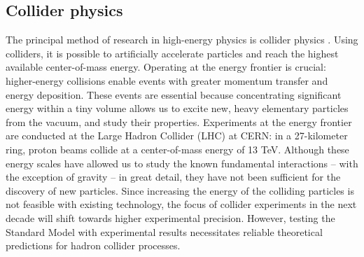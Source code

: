 \documentclass[a4paper, 12pt]{book}
\begin{document}
\subsection{Collider physics}
The principal method of research in high-energy physics is collider physics \cite{ellis}. Using colliders, it is possible to artificially accelerate particles and reach the highest available center-of-mass energy. Operating at the energy frontier is crucial: higher-energy collisions enable events with greater momentum transfer and energy deposition. These events are essential because concentrating significant energy within a tiny volume allows us to excite new, heavy elementary particles from the vacuum, and study their properties. Experiments at the energy frontier are conducted at the Large Hadron Collider (LHC) at CERN: in a 27-kilometer ring, proton beams collide at a center-of-mass energy of 13 TeV. Although these energy scales have allowed us to study the known fundamental interactions – with the exception of gravity – in great detail, they have not been sufficient for the discovery of new particles. Since increasing the energy of the colliding particles is not feasible with existing technology, the focus of collider experiments in the next decade will shift towards higher experimental precision. However, testing the Standard Model with experimental results necessitates reliable theoretical predictions for hadron collider processes. \\
\end{document}

